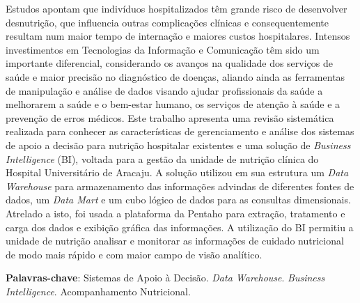 \setlength{\absparsep}{18pt} %
\begin{resumo}

Estudos apontam que indivíduos hospitalizados têm grande risco de desenvolver desnutrição, que influencia outras complicações clínicas e consequentemente resultam num maior tempo de internação e maiores custos hospitalares. 
Intensos investimentos em Tecnologias da Informação e Comunicação têm sido um importante diferencial, considerando os avanços na qualidade dos serviços de saúde e maior precisão no diagnóstico de doenças, aliando ainda as ferramentas de manipulação e análise de dados visando ajudar profissionais da saúde a melhorarem a saúde e o bem-estar humano, os serviços de atenção à saúde e a prevenção de erros médicos. 
Este trabalho apresenta uma revisão sistemática realizada para conhecer as características de gerenciamento e análise dos sistemas de apoio a decisão para nutrição hospitalar existentes e uma solução de \textit{Business Intelligence} (BI), voltada para a gestão da unidade de nutrição clínica do Hospital Universitário de Aracaju. A solução utilizou em sua estrutura um \textit{Data Warehouse} para armazenamento das informações advindas de diferentes fontes de dados, um \textit{Data Mart} e um cubo lógico de dados para as consultas dimensionais. 
Atrelado a isto, foi usada a plataforma da Pentaho para extração, tratamento e carga dos dados e exibição gráfica das informações. A utilização do BI permitiu a unidade de nutrição analisar e monitorar as informações de cuidado nutricional de modo mais rápido e com maior campo de visão analítico. 


 \textbf{Palavras-chave}: Sistemas de Apoio à Decisão. \textit{Data Warehouse}. \textit{Business Intelligence}. Acompanhamento Nutricional.
\end{resumo}